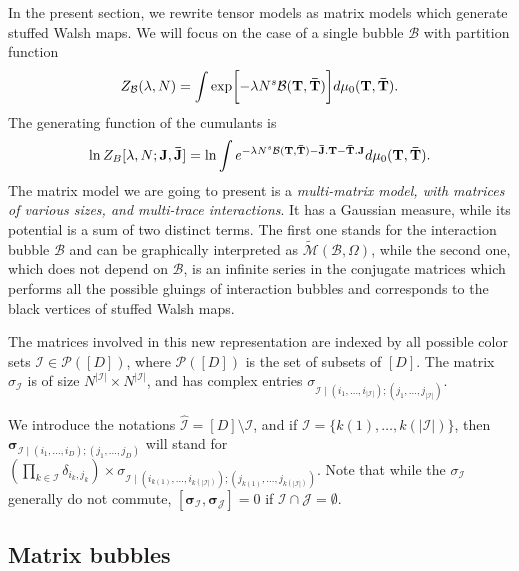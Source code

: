 \documentclass[aps,prd,10pt,notitlepage,nofootinbib,superscriptaddress,showkeys,showpacs]{revtex4-1}
\begin{document}
In the present section, we rewrite tensor models as matrix models which generate stuffed Walsh maps. We will focus on the case  of a single bubble ${\mathcal{B}}$ with partition function
\begin{equation}
Z_{\mathcal{B}}(\lambda, N)=\int \exp\biggl[-\lambda N^s {\mathcal{B}}({\bf T}, {\bf \bar{T}})\biggr]d\mu_{0}({\bf T}, {\bf \bar{T}}).
\end{equation}
The generating function of the cumulants is 
\begin{equation}
\ln Z_{B}[\lambda, N;{\bf J, \bar J}]
=
\ln\int e^{-{\lambda}{N^s} {\mathcal{B}}({\bf T}, {\bf \bar{T}})-{\bf \bar{J}.T-\bar{T}.J}}d\mu_{0}({\bf T}, {\bf \bar{T}}).
\end{equation}
The matrix model we are going to present is a \emph{multi-matrix model, with matrices of various sizes, and multi-trace interactions}. It has a Gaussian measure, while its potential is a sum of two distinct terms. The first one stands for the interaction bubble ${\mathcal{B}}$ and can be graphically interpreted as $\tilde{\mathcal{M}}({\mathcal{B}}, \Omega)$, while the second one, which does not depend on ${\mathcal{B}}$, is an infinite series in the conjugate matrices which performs all the possible gluings of interaction bubbles and corresponds to the black vertices of stuffed Walsh maps.

The matrices involved in this new representation are indexed by all possible color sets ${\mathcal{I}}\in{\mathcal{P}}([D])$, where ${\mathcal{P}}([D])$ is the set of subsets of $[D]$. The matrix $\sigma_{\mathcal{I}}$ is of size $N^{\lvert{\mathcal{I}}\rvert}\times N^{\lvert{\mathcal{I}}\rvert}$, and has complex entries $\sigma_{{\mathcal{I}}\mid(i_{1},\dotsc, i_{\lvert{\mathcal{I}}\rvert});(j_{1},\dotsc, j_{\lvert{\mathcal{I}}\rvert})}$.

We introduce the notations ${\widehat{\mathcal{I}}}= [D]\setminus{\mathcal{I}}$, and if ${\mathcal{I}}=\{k(1),\dotsc,k(\lvert{\mathcal{I}}\rvert)\}$, then ${\bm{\sigma}}_{{\mathcal{I}}\mid (i_{1},\dotsc, i_{D});(j_{1},\dotsc, j_{D})}$ will stand for $(\prod_{k\in{\widehat{\mathcal{I}}}}\delta_{i_{k},j_{k}})\times\sigma_{{\mathcal{I}}\mid (i_{k(1)},\dotsc, i_{k( \lvert{\mathcal{I}}\rvert )});(j_{k(1)},\dotsc, j_{k(\lvert{\mathcal{I}}\rvert)})}$. Note that while the $\sigma_{\mathcal{I}}$ generally do not commute, $[{\bm{\sigma}}_{\mathcal{I}},{\bm{\sigma}}_{\mathcal{J}}]=0$ if ${\mathcal{I}}\cap{\mathcal{J}}=\emptyset$.

 
\subsection{Matrix bubbles}
\end{document}
